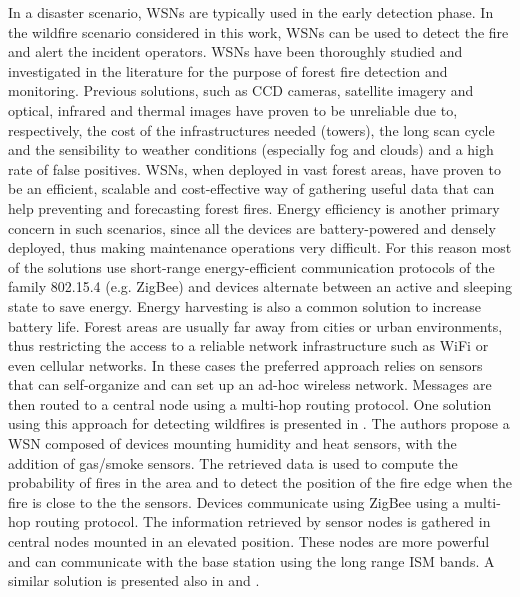 In a disaster scenario, \glspl{WSN} are typically used in the early detection phase. In the wildfire scenario considered in this work, \glspl{WSN} can be used to detect the fire and alert the incident operators. \glspl{WSN} have been thoroughly studied and investigated in the literature for the purpose of forest fire detection and monitoring. Previous solutions, such as CCD cameras, satellite imagery and optical, infrared and thermal images have proven to be unreliable due to, respectively, the cost of the infrastructures needed (towers), the long scan cycle and the sensibility to weather conditions (especially fog and clouds) and a high rate of false positives. \glspl{WSN}, when deployed in vast forest areas, have proven to be an efficient, scalable and cost-effective way of gathering useful data that can help preventing and forecasting forest fires. Energy efficiency is another primary concern in such scenarios, since all the devices are battery-powered and densely deployed, thus making maintenance operations very difficult. For this reason most of the solutions use short-range energy-efficient communication protocols of the family 802.15.4 (e.g. ZigBee) and devices alternate between an active and sleeping state to save energy. Energy harvesting is also a common solution to increase battery life. Forest areas are usually far away from cities or urban environments, thus restricting the access to a reliable network infrastructure such as WiFi or even cellular networks. In these cases the preferred approach relies on sensors that can self-organize and can set up an ad-hoc wireless network. Messages are then routed to a central node using a multi-hop routing protocol. One solution using this approach for detecting wildfires is presented in \cite{ref:soa-wsn1}. The authors propose a WSN composed of devices mounting humidity and heat sensors, with the addition of gas/smoke sensors. The retrieved data is used to compute the probability of fires in the area and to detect the position of the fire edge when the fire is close to the the sensors. Devices communicate using ZigBee using a multi-hop routing protocol. The information retrieved by sensor nodes is gathered in central nodes mounted in an elevated position. These nodes are more powerful and can communicate with the base station using the long range \gls{ISM} bands. A similar solution is presented also in \cite{undefined} and \cite{ref:soa-wsn2}. \\

